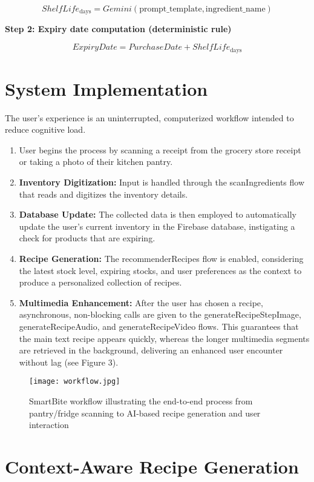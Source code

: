 \documentclass[conference]{IEEEtran}
\begin{document}
\[
ShelfLife_{\text{days}} = Gemini(\text{prompt\_template}, \text{ingredient\_name})
\]

\textbf{Step 2: Expiry date computation (deterministic rule)}

\[
ExpiryDate = PurchaseDate + ShelfLife_{\text{days}}
\]

\section{System Implementation}

The user's experience is an uninterrupted, computerized workflow intended to reduce cognitive load.

\begin{enumerate}
  \item User begins the process by scanning a receipt from the grocery store receipt or taking a photo of their kitchen pantry.
  \item \textbf{Inventory Digitization:} Input is handled through the scanIngredients flow that reads and digitizes the inventory details.
  \item \textbf{Database Update:} The collected data is then employed to automatically update the user's current inventory in the Firebase database, instigating a check for products that are expiring.
  \item \textbf{Recipe Generation:} The recommenderRecipes flow is enabled, considering the latest stock level, expiring stocks, and user preferences as the context to produce a personalized collection of recipes.
  \item \textbf{Multimedia Enhancement:} After the user has chosen a recipe, asynchronous, non-blocking calls are given to the generateRecipeStepImage, generateRecipeAudio, and generateRecipeVideo flows. This guarantees that the main text recipe appears quickly, whereas the longer multimedia segments are retrieved in the background, delivering an enhanced user encounter without lag (see Figure 3).
\end{enumerate}

\begin{figure}[h]
  \centering
  \texttt{[image: workflow.jpg]}
  \caption{SmartBite workflow illustrating the end-to-end process from pantry/fridge scanning to AI-based recipe generation and user interaction}
  \label{fig:workflow}
\end{figure}

\section{Context-Aware Recipe Generation}
\end{document}
